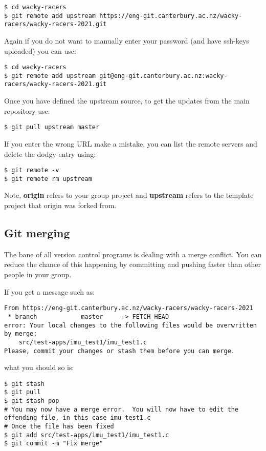 \begin{verbatim}
$ cd wacky-racers 
$ git remote add upstream https://eng-git.canterbury.ac.nz/wacky-racers/wacky-racers-2021.git  
\end{verbatim}

Again if you do not want to manually enter your password (and have
ssh-keys uploaded) you can use:
%
\begin{verbatim}
$ cd wacky-racers 
$ git remote add upstream git@eng-git.canterbury.ac.nz:wacky-racers/wacky-racers-2021.git
\end{verbatim}

Once you have defined the upstream source, to get the updates from the
main repository use:
%
\begin{verbatim}
$ git pull upstream master
\end{verbatim}

If you enter the wrong URL make a mistake, you can list the remote
servers and delete the dodgy entry using:

\begin{verbatim}
$ git remote -v
$ git remote rm upstream
\end{verbatim}

Note, \textbf{origin} refers to your group project and \textbf{upstream}
refers to the template project that origin was forked from.

\subsection{Git merging}
\label{git-merging}

The bane of all version control programs is dealing with a merge
conflict. You can reduce the chance of this happening by committing and
pushing faster than other people in your group.

If you get a message such as:

\begin{verbatim}
From https://eng-git.canterbury.ac.nz/wacky-racers/wacky-racers-2021
 * branch            master     -> FETCH_HEAD
error: Your local changes to the following files would be overwritten by merge:
    src/test-apps/imu_test1/imu_test1.c
Please, commit your changes or stash them before you can merge.
\end{verbatim}

what you should so is:

\begin{verbatim}
$ git stash
$ git pull
$ git stash pop
# You may now have a merge error.  You will now have to edit the offending file, in this case imu_test1.c
# Once the file has been fixed
$ git add src/test-apps/imu_test1/imu_test1.c
$ git commit -m "Fix merge"
\end{verbatim}

